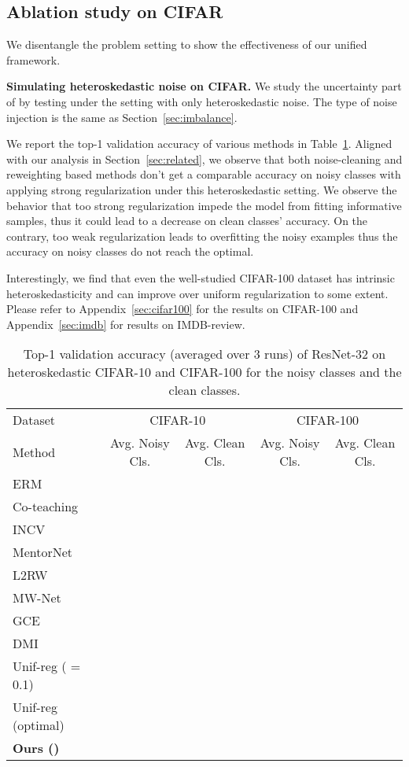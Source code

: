 \subsection{Ablation study on CIFAR} We disentangle the problem setting to show the effectiveness of our uniﬁed framework. 

\textbf{Simulating heteroskedastic noise on CIFAR.} We study the uncertainty part of \ours{} by testing under the setting with only heteroskedastic noise. The type of noise injection is the same as Section~\ref{sec:imbalance}. 

We report the top-1 validation accuracy of various methods in Table~\ref{tab:CIFAR_full}. 
Aligned with our analysis in Section~\ref{sec:related}, we observe that both noise-cleaning and reweighting based methods don't get a comparable accuracy on noisy classes with applying strong regularization  under this heteroskedastic setting.
We observe the behavior that too strong regularization impede the model from fitting informative samples, thus it could lead to a decrease on clean classes' accuracy. On the contrary, too weak regularization leads to overfitting the noisy examples thus the accuracy on noisy classes do not reach the optimal.

Interestingly, we find that even the well-studied CIFAR-100 dataset has intrinsic heteroskedasticity and \ours{} can improve over uniform regularization to some extent. Please refer to Appendix~\ref{sec:cifar100} for the results on CIFAR-100 and Appendix~\ref{sec:imdb} for results on IMDB-review. 

\begin{table}[htpb]
\centering
\caption{Top-1 validation accuracy (averaged over 3 runs) of ResNet-32 on heteroskedastic CIFAR-10 and CIFAR-100 for the noisy classes and the clean classes.}
\label{tab:CIFAR_full}
{\small
\begin{tabular}{lcc|cc}
\toprule
Dataset             & \multicolumn{2}{c|}{CIFAR-10}        & \multicolumn{2}{c}{CIFAR-100}                \\
Method           &  Avg. Noisy Cls. &  Avg. Clean Cls.   & Avg. Noisy Cls. &  Avg. Clean Cls.   \\ \midrule
ERM &  &  &  &  \\ 
Co-teaching &  &  &  &  \\ 
INCV &  &  &  &  \\ 
MentorNet &  &  &  &  \\ 
L2RW &  &  &  &  \\ 
MW-Net &  &  &  &  \\
GCE &  &  &  &  \\
DMI &  &  &  &  \\
\midrule
Unif-reg ( = 0.1) &  &  &  &  \\ 
Unif-reg (optimal) &  &  &  &  \\ 
\textbf{Ours (\ours{})} &  &  &  &  \\ 
\bottomrule
\end{tabular}}
\end{table}

